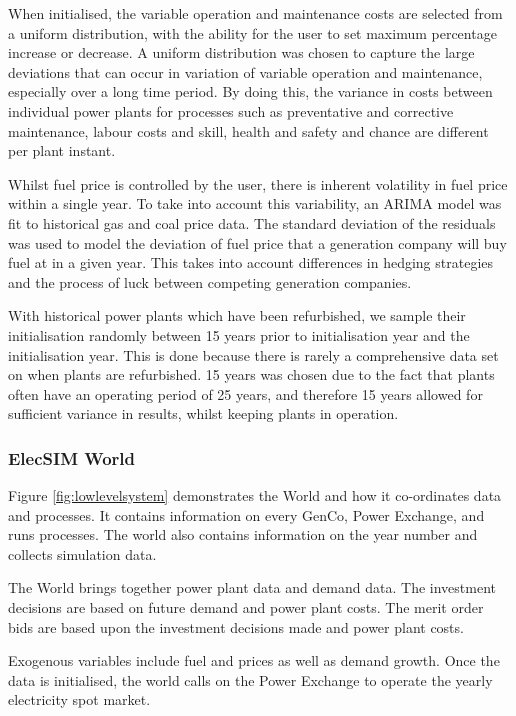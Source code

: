 When initialised, the variable operation and maintenance costs are selected from a uniform distribution, with the ability for the user to set maximum percentage increase or decrease. A uniform distribution was chosen to capture the large deviations that can occur in variation of variable operation and maintenance, especially over a long time period. By doing this, the variance in costs between individual power plants for processes such as preventative and corrective maintenance, labour costs and skill, health and safety and chance are different per plant instant.  

Whilst fuel price is controlled by the user, there is inherent volatility in fuel price within a single year. To take into account this variability, an ARIMA model was fit to historical gas and coal price data. The standard deviation of the residuals was used to model the deviation of fuel price that a generation company will buy fuel at in a given year. This takes into account differences in hedging strategies and the process of luck between competing generation companies.

With historical power plants which have been refurbished, we sample their initialisation randomly between 15 years prior to initialisation year and the initialisation year. This is done because there is rarely a comprehensive data set on when plants are refurbished. 15 years was chosen due to the fact that plants often have an operating period of 25 years, and therefore 15 years allowed for sufficient variance in results, whilst keeping plants in operation.

\subsubsection{ElecSIM World}

Figure \ref{fig:lowlevelsystem} demonstrates the World and how it co-ordinates data and processes. It contains information on every GenCo, Power Exchange, and runs processes. The world also contains information on the year number and collects simulation data.

The World brings together power plant data and demand data. The investment decisions are based on future demand and power plant costs. The merit order bids are based upon the investment decisions made and power plant costs.

Exogenous variables include fuel and  prices as well as demand growth. Once the data is initialised, the world calls on the Power Exchange to operate the yearly electricity spot market.

